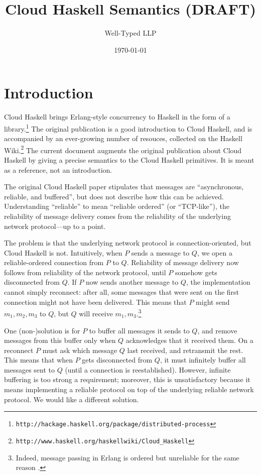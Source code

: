 \documentclass{article}
\begin{document}
\title{Cloud Haskell Semantics (DRAFT)}
\author{Well-Typed LLP}
\date{\today}

\maketitle

\section{Introduction}

Cloud Haskell brings Erlang-style concurrency to Haskell in the form of a
library.\footnote{\texttt{http://hackage.haskell.org/package/distributed-process}}
The original publication \cite{cloudhaskell} is a good introduction to Cloud
Haskell, and is accompanied by an ever-growing number of resouces, collected on
the Haskell
Wiki.\footnote{\texttt{http://www.haskell.org/haskellwiki/Cloud\_Haskell}} The
current document augments the original publication about Cloud Haskell by
giving a precise semantics to the Cloud Haskell primitives. It is meant as a
reference, not an introduction.

The original Cloud Haskell paper stipulates that messages are ``asynchronous,
reliable, and buffered'', but does not describe how this can be achieved.
Understanding ``reliable'' to mean ``reliable ordered'' (or ``TCP-like''), 
the reliability of message delivery comes from the reliability of the
underlying network protocol---up to a point. 

The problem is that the underlying network protocol is connection-oriented, but
Cloud Haskell is not. Intuitively, when $P$ sends a message to $Q$, we open a
reliable-ordered connection from $P$ to $Q$. Reliability of message delivery
now follows from reliability of the network protocol, until $P$ somehow gets
disconnected from $Q$. If $P$ now sends another message to $Q$, the
implementation cannot simply reconnect: after all, some messages that were sent
on the first connection might not have been delivered. This means that $P$
might send $m_1, m_2, m_3$ to $Q$, but $Q$ will receive $m_1,
m_3$.\footnote{Indeed, message passing in Erlang is ordered but unreliable for
the same reason \cite{erlang}.}

One (non-)solution is for $P$ to buffer all messages it sends to $Q$, and
remove messages from this buffer only when $Q$ acknowledges that it received
them. On a reconnect $P$ must ask which message $Q$ last received, and
retransmit the rest. This means that when $P$ gets disconnected from $Q$, it
must infinitely buffer all messages sent to $Q$ (until a connection is
reestablished). However, infinite buffering is too strong a requirement;
moreover, this is unsatisfactory because it means implementing a reliable
protocol on top of the underlying reliable network protocol. We would like a
different solution.
\end{document}

